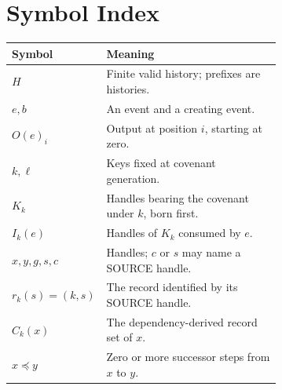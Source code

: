 \documentclass[../main.tex]{subfiles}
\begin{document}
\section{Symbol Index}
\label{app:kpc:symbols}
\begin{longtable}{@{}l p{0.68\linewidth}@{}}
\toprule
Symbol & Meaning \\
\midrule
$H$ & Finite valid history; prefixes are histories. \\
$e,b$ & An event and a creating event. \\
$O(e)_i$ & Output at position $i$, starting at zero. \\
$k,\ell$ & Keys fixed at covenant generation. \\
$K_k$ & Handles bearing the covenant under $k$, born first. \\
$I_k(e)$ & Handles of $K_k$ consumed by $e$. \\
$x,y,g,s,c$ & Handles; $c$ or $s$ may name a SOURCE handle. \\
$r_k(s)=(k,s)$ & The record identified by its SOURCE handle. \\
$C_k(x)$ & The dependency-derived record set of $x$. \\
$x\preceq y$ & Zero or more successor steps from $x$ to $y$. \\
\bottomrule
\end{longtable}
\end{document}
